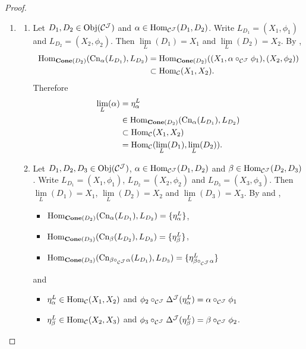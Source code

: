 \documentclass{book}
\begin{document}
\begin{proof}\
	\begin{enumerate}
		\item 
		\begin{enumerate}
			\item Let $D_1, D_2 \in \operatorname{Obj}(\mathcal{C}^{\mathcal{J}})$ and $\alpha \in \operatorname{Hom}_{\mathcal{C}^{\mathcal{J}}}(D_1, D_2)$. Write $L_{D_1} = (X_1, \phi_1)$ and $L_{D_2} = (X_2, \phi_2)$. Then $\lim\limits_L(D_1) = X_1$ and $\lim\limits_L(D_2) = X_2$. By ,  
			\begin{align*}
				\operatorname{Hom}_{\operatorname*{\text{\textbf{Cone}}}(D_2)}(\text{Cn}_{\alpha}(L_{D_1}), L_{D_2}) 
				& = \operatorname{Hom}_{\operatorname*{\text{\textbf{Cone}}}(D_2)}((X_1, \alpha \circ_{\mathcal{C}^{\mathcal{J}}} \phi_1), (X_2, \phi_2)) \\
				& \subset \operatorname{Hom}_{\mathcal{C}}(X_1, X_2).
			\end{align*}
			Therefore 
			\begin{align*}
				\lim\limits_L(\alpha)
				& = \eta^L_{\alpha} \\
				& \in \operatorname{Hom}_{\operatorname*{\text{\textbf{Cone}}}(D_2)}(\text{Cn}_{\alpha}(L_{D_1}), L_{D_2}) \\
				& \subset \operatorname{Hom}_{\mathcal{C}}(X_1, X_2) \\
				& = \operatorname{Hom}_{\mathcal{C}}(\lim\limits_L(D_1), \lim\limits_L(D_2)).
			\end{align*}
			\item Let $D_1, D_2, D_3 \in \operatorname{Obj}(\mathcal{C}^{\mathcal{J}})$, $\alpha \in \operatorname{Hom}_{\mathcal{C}^{\mathcal{J}}}(D_1, D_2)$ and $\beta \in \operatorname{Hom}_{\mathcal{C}^{\mathcal{J}}}(D_2, D_3)$. Write $L_{D_1} = (X_1, \phi_1)$, $L_{D_2} = (X_2, \phi_2)$ and $L_{D_3} = (X_3, \phi_3)$. Then $\lim\limits_L(D_1) = X_1$, $\lim\limits_L(D_2) = X_2$ and $\lim\limits_L(D_3) = X_3$. By  and ,
			\begin{itemize}
				\item $\operatorname{Hom}_{\operatorname*{\text{\textbf{Cone}}}(D_2)}(\text{Cn}_{\alpha}(L_{D_1}), L_{D_2}) = \{\eta^L_{\alpha}\}$, \item $\operatorname{Hom}_{\operatorname*{\text{\textbf{Cone}}}(D_3)}(\text{Cn}_{\beta}(L_{D_2}), L_{D_3}) = \{\eta^L_{\beta}\}$,
				\item $\operatorname{Hom}_{\operatorname*{\text{\textbf{Cone}}}(D_3)}(\text{Cn}_{\beta \circ_{\mathcal{C}^{\mathcal{J}}} \alpha}(L_{D_1}), L_{D_3}) = \{\eta^L_{\beta \circ_{\mathcal{C}^{\mathcal{J}}} \alpha}\}$
			\end{itemize}
			and
			\begin{itemize}
				\item $\eta^L_{\alpha} \in \operatorname{Hom}_{\mathcal{C}}(X_1, X_2)$ and $\phi_2 \circ_{\mathcal{C}^{\mathcal{J}}} \Delta^{\mathcal{J}}(\eta^L_{\alpha}) = \alpha \circ_{\mathcal{C}^{\mathcal{J}}} \phi_1$
				\item $\eta^L_{\beta} \in \operatorname{Hom}_{\mathcal{C}}(X_2, X_3)$ and $\phi_3 \circ_{\mathcal{C}^{\mathcal{J}}} \Delta^{\mathcal{J}}(\eta^L_{\beta}) = \beta \circ_{\mathcal{C}^{\mathcal{J}}} \phi_2$.

\end{itemize}
\end{enumerate}
\end{enumerate}
\end{proof}
\end{document}
